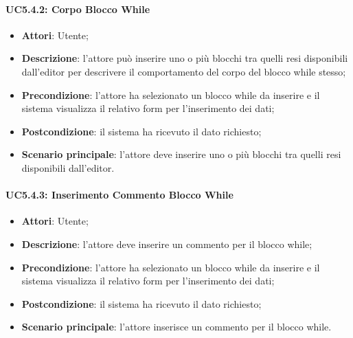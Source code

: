 \begin{itemize}
\begin{itemize}
\begin{itemize}
\begin{itemize}
\paragraph{UC5.4.2: Corpo Blocco While}
\label{UC5.4.2}
\begin{itemize}
	\item \textbf{Attori}: Utente;
	\item \textbf{Descrizione}: l'attore può inserire uno o più blocchi tra quelli resi disponibili dall'editor per descrivere il comportamento del corpo del blocco while stesso;
	\item \textbf{Precondizione}: l'attore ha selezionato un blocco while da inserire e il sistema visualizza il relativo form per l'inserimento dei dati;
	\item \textbf{Postcondizione}: il sistema ha ricevuto il dato richiesto;
	\item \textbf{Scenario principale}: l'attore deve inserire uno o più blocchi tra quelli resi disponibili dall'editor.
\end{itemize}

\paragraph{UC5.4.3: Inserimento Commento Blocco While}
\label{UC5.4.3}
\begin{itemize}
	\item \textbf{Attori}: Utente;
	\item \textbf{Descrizione}: l'attore deve inserire un commento per il blocco while;
	\item \textbf{Precondizione}: l'attore ha selezionato un blocco while da inserire e il sistema visualizza il relativo form per l'inserimento dei dati;
	\item \textbf{Postcondizione}: il sistema ha ricevuto il dato richiesto;
	\item \textbf{Scenario principale}: l'attore inserisce un commento per il blocco while.
\end{itemize}


\end{itemize}
\end{itemize}
\end{itemize}
\end{itemize}
